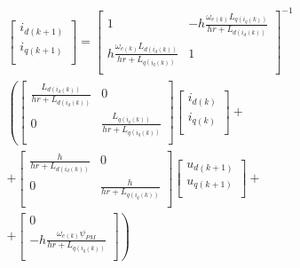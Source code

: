 \documentclass[9pt,conference]{IEEEtran}
\begin{document}
\begin{subequations}
	\begin{equation}
		\begin{aligned}
			\begin{bmatrix}
				i_{d(k+1)} \\
				i_{q(k+1)} \\
			\end{bmatrix}
			=
			\begin{bmatrix}
				1                                                    & -h\frac{\omega_{e(k)}L_{q(i_q(k))}}{hr+L_{d(i_d(k))}} \\
				h\frac{\omega_{e(k)}L_{d(i_d(k))}}{hr+L_{q(i_q(k))}} & 1                                                     \\
			\end{bmatrix}^{-1} \\
			\left(
			\begin{bmatrix}
					\frac{L_{d(i_d(k))}}{hr+L_{d(i_d(k))}} & 0                                      \\
					0                                      & \frac{L_{q(i_q(k))}}{hr+L_{q(i_q(k))}} \\
				\end{bmatrix}
			\begin{bmatrix}
					i_{d(k)} \\
					i_{q(k)} \\
				\end{bmatrix}+\right. \\ +
			\begin{bmatrix}
					\frac{h}{hr+L_{d(i_d(k))}} & 0                          \\
					0                          & \frac{h}{hr+L_{q(i_q(k))}} \\
				\end{bmatrix}
			\begin{bmatrix}
					u_{d(k+1)} \\
					u_{q(k+1)} \\
				\end{bmatrix}
			+\\+\left.
			\begin{bmatrix}
					0                                                 \\
					-h\frac{\omega_{e(k)}\psi_{PM}}{hr+L_{q(i_q(k))}} \\
				\end{bmatrix}
			\right)
		\end{aligned}
	\end{equation}


\end{subequations}
\end{document}
